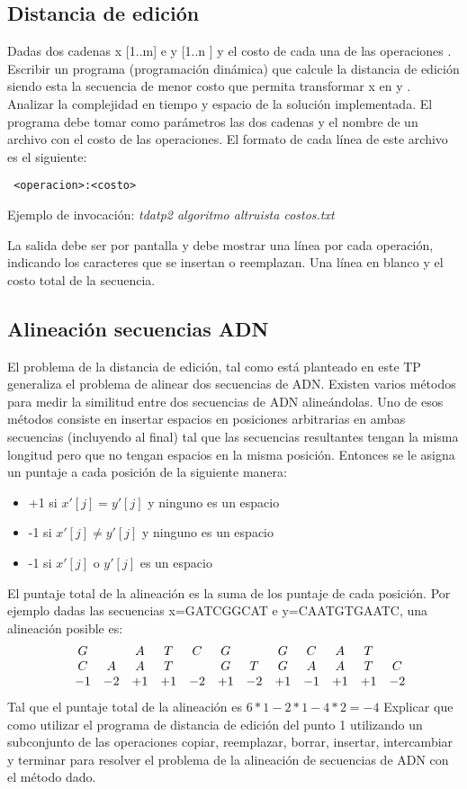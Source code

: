 \documentclass[12pt]{article}
\begin{document}
\newpage
\subsection{Distancia de edición}
Dadas dos cadenas x [1..m] e y [1..n ] y el costo de cada una de las operaciones
. Escribir un programa (programación dinámica) que calcule la distancia de edición
siendo esta la secuencia de menor costo que permita transformar x en y .
Analizar la complejidad en tiempo y espacio de la solución implementada.
El programa debe tomar como parámetros las dos cadenas y el nombre de un
archivo con el costo de las operaciones. El formato de cada línea de este archivo
es el siguiente:

\verb# <operacion>:<costo>#

Ejemplo de invocación: \emph{tdatp2 algoritmo altruista costos.txt}

La salida debe ser por pantalla y debe mostrar una línea por cada operación,
indicando los caracteres que se insertan o reemplazan. Una línea en blanco y el costo total de
la secuencia.

\subsection{Alineación secuencias ADN}
El problema de la distancia de edición, tal como está planteado en este TP generaliza el
problema de alinear dos secuencias de ADN. Existen varios métodos para medir la
similitud entre dos secuencias de ADN alineándolas. Uno de esos métodos consiste en
insertar espacios en posiciones arbitrarias en ambas secuencias (incluyendo al final) tal
que las secuencias resultantes tengan la misma longitud pero que no tengan espacios en
la misma posición. Entonces se le asigna un puntaje a cada posición de la siguiente
manera:

\begin{itemize}
	\item +1 si $x'[j]=y'[j]$ y ninguno es un espacio
	\item -1 si $x'[j]\neq y'[j]$ y ninguno es un espacio
	\item -1 si $x'[j]$ o $y'[j]$ es un espacio
\end{itemize}

El puntaje total de la alineación es la suma de los puntaje de cada posición. Por ejemplo
dadas las secuencias x=GATCGGCAT e y=CAATGTGAATC, una alineación posible
es:
\[
\begin{array}{ccccccccccccc}
  &G &\space &A &T &C &G &\space &G &C &A &T &\space  \\
  &C &A &A &T &\space &G &T &G &A &A &T &C	\\
  &-1 &-2 &+1 &+1 &-2 &+1 &-2 &+1 &-1 &+1 &+1 &-2
\end{array}
\]
Tal que el puntaje total de la alineación es $6*1-2*1-4*2=-4$
Explicar que como utilizar el programa de distancia de edición del punto 1
utilizando un subconjunto de las operaciones copiar, reemplazar, borrar, insertar,
intercambiar y terminar para resolver el problema de la alineación de secuencias de
ADN con el método dado.


\newpage

\end{document}
